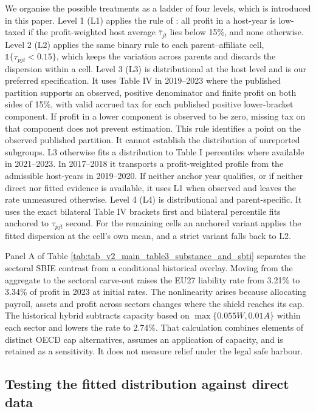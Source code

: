 \documentclass[11pt,a4paper]{article}
\begin{document}
We organise the possible treatments as a ladder of four levels, which is introduced in this paper. Level 1 (L1) applies the rule of \citet{barake2022}: all profit in a host-year is low-taxed if the profit-weighted host average $\bar\tau_{jt}$ lies below 15\%, and none otherwise. Level 2 (L2) applies the same binary rule to each parent–affiliate cell, $\mathbb{1}\{\tau_{pjt}<0.15\}$, which keeps the variation across parents and discards the dispersion within a cell. Level 3 (L3) is distributional at the host level and is our preferred specification. It uses Table IV in 2019–2023 where the published partition supports an observed, positive denominator and finite profit on both sides of 15\%, with valid accrued tax for each published positive lower-bracket component. If profit in a lower component is observed to be zero, missing tax on that component does not prevent estimation. This rule identifies a point on the observed published partition. It cannot establish the distribution of unreported subgroups. L3 otherwise fits a distribution to Table I percentiles where available in 2021–2023. In 2017–2018 it transports a profit-weighted profile from the admissible host-years in 2019–2020. If neither anchor year qualifies, or if neither direct nor fitted evidence is available, it uses L1 when observed and leaves the rate unmeasured otherwise. Level 4 (L4) is distributional and parent-specific. It uses the exact bilateral Table IV brackets first and bilateral percentile fits anchored to $\tau_{pjt}$ second. For the remaining cells an anchored variant applies the fitted dispersion at the cell's own mean, and a strict variant falls back to L2.



Panel A of Table \ref{tab:tab_v2_main_table3_substance_and_sbti} separates the sectoral SBIE contrast from a conditional historical overlay. Moving from the aggregate to the sectoral carve-out raises the EU27 liability rate from 3.21\% to 3.34\% of profit in 2023 at initial rates. The nonlinearity arises because allocating payroll, assets and profit across sectors changes where the shield reaches its cap. The historical hybrid subtracts capacity based on $\max\{0.055W,0.01A\}$ within each sector and lowers the rate to 2.74\%. That calculation combines elements of distinct OECD cap alternatives, assumes an application of capacity, and is retained as a sensitivity. It does not measure relief under the legal safe harbour.

\subsection{Testing the fitted distribution against direct data}\label{sec:etr_validation}
\end{document}
